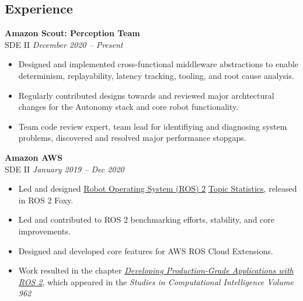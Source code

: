 \documentclass[11pt, twoside, a4paper]{article}
\begin{document}
{\begin{multicols}{2}
            \section*{Experience}
            \noindent
                \textbf{Amazon Scout: Perception Team}\\
                SDE II \hfill \textsl{December 2020 -- Present} \\
                \vspace{ -10px}
                \begin{itemize}[noitemsep,nolistsep]
	           \item Designed and implemented cross-functional middleware abstractions to enable determinism,  replayability, latency tracking, tooling, and root cause analysis.
                    \item Regularly contributed designs towards and reviewed major archtectural changes for the Autonomy stack and core robot functionality.
		  \item Team code review expert, team lead for identifiying and diagnosing system problems, discovered and resolved major performance stopgaps.
                \end{itemize}
                \vspace{10px}
                \textbf{Amazon AWS}\\
                SDE II \hfill \textsl{January 2019 -- Dec 2020} \\
                \vspace{ -10px}
                \begin{itemize}[noitemsep,nolistsep]
	           \item Led and designed \href{https://docs.ros.org/}{Robot Operating System (ROS) 2} \href{https://docs.ros.org/en/rolling/Concepts/About-Topic-Statistics.html}{Topic Statistics}, released in ROS 2 Foxy.	
                    \item Led and contributed to ROS 2 benchmarking efforts, stability, and core improvements.
                    \item Designed and developed core features for AWS ROS Cloud Extensions.
                    \item Work resulted in the chapter \href{https://link.springer.com/chapter/10.1007/978-3-030-75472-3_1}{\textit{Developing Production-Grade Applications with ROS 2}}, which appeared in the \textit{Studies in Computational Intelligence Volume 962}

\end{itemize}
\end{multicols}}
\end{document}
